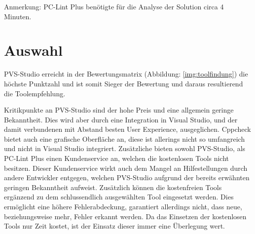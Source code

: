 Anmerkung: PC-Lint Plus benötigte für die Analyse der Solution circa 4 Minuten.

\section{Auswahl}
\label{sec:auswahl}

PVS-Studio erreicht in der Bewertungsmatrix (Abbildung: \ref{img:toolfindung}) die höchste Punktzahl und ist somit Sieger der Bewertung und daraus resultierend die Toolempfehlung.

Kritikpunkte an PVS-Studio sind der hohe Preis und eine allgemein geringe Bekanntheit. Dies wird aber durch eine Integration in Visual Studio, und der damit verbundenen mit Abstand 
besten User Experience, ausgeglichen. Cppcheck bietet auch eine grafische Oberfläche an, diese ist allerings nicht so umfangreich und nicht in Visual Studio integriert. \newline
Zusätzliche bieten sowohl PVS-Studio, als PC-Lint Plus einen Kundenservice an, welchen die kostenlosen Tools nicht besitzen. Dieser Kundenservice wirkt auch dem Mangel an Hilfestellungen 
durch andere Entwickler entgegen, welchen PVS-Studio aufgrund der bereits erwähnten geringen Bekanntheit aufweist. \newline
Zusätzlich können die kostenfreien Tools ergänzend zu dem schlussendlich ausgewählten Tool eingesetzt werden. Dies ermöglicht eine höhere Fehlerabdeckung, garantiert allerdings nicht,
dass neue, beziehungsweise mehr, Fehler erkannt werden. Da das Einsetzen der kostenlosen Tools nur Zeit kostet, ist der Einsatz dieser immer eine Überlegung wert.